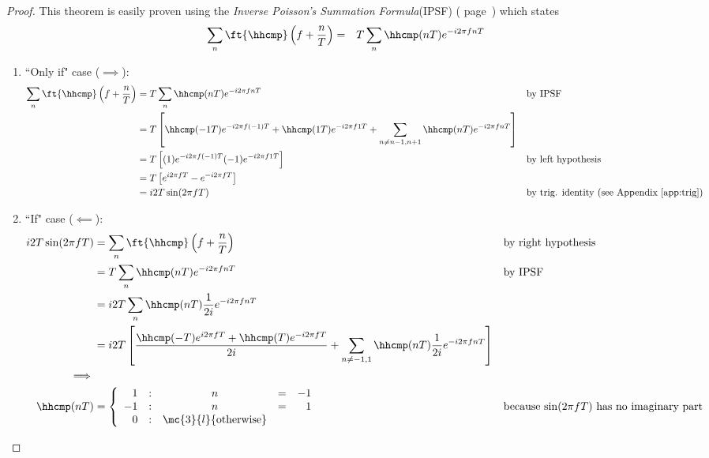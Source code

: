 \begin{proof}
This theorem is easily proven using the
{\em Inverse Poisson's Summation Formula}(IPSF)
( page~\pageref{thm:ipsf})
which states
\begin{eqnarray*}
   \sum_n \ft{\hhcmp}\left( f+ \frac{n}{T} \right)
      &=& T \sum_n \hhcmp(nT) e^{-i2\pi fnT}
\end{eqnarray*}

\begin{enumerate}
  \item ``Only if" case ($\implies$):
\begin{align*}
   \sum_n \ft{\hhcmp}\left( f + \frac{n}{T} \right)
       &= T\sum_n \hhcmp(nT) e^{-i2\pi fnT}
       && \text{by IPSF}
     \\&= T\left[
                  \hhcmp(-1T) e^{-i2\pi f(-1)T} +
                  \hhcmp(1T) e^{-i2\pi f1T} +
                  \sum_{n\ne n-1,n+1} \hhcmp(nT) e^{-i2\pi fnT}
               \right]
     \\&= T\left[
                  (1)  e^{-i2\pi f(-1)T}
                  (-1) e^{-i2\pi f1T}
               \right]
       && \text{by left hypothesis}
     \\&= T\left[e^{i2\pi fT} -e^{-i2\pi fT} \right]
     \\&= i2T \sin( 2\pi fT )
       && \text{by trig. identity (see Appendix \ref{app:trig})}
\end{align*}

\item ``If" case ($\impliedby$):
\begin{align*}
   i2T \sin( 2\pi fT )
       &= \sum_n \ft{\hhcmp}\left( f+\frac{n}{T} \right)
       && \text{by right hypothesis}
     \\&= T \sum_n \hhcmp(nT) e^{-i2\pi fnT}
       && \text{by IPSF}
     \\&= i2T \sum_n \hhcmp(nT) \frac{1}{2i}e^{-i2\pi fnT}
     \\&= i2T \left[
                 \frac{\hhcmp(-T)e^{i2\pi fT} + \hhcmp( T)e^{-i2\pi fT}}
                      {2i}
                 + \sum_{n\ne-1,1} \hhcmp(nT) \frac{1}{2i}e^{-i2\pi fnT}
              \right]
     \\ \implies
\\
   \hhcmp(nT)
   &= \left\{
      \begin{array}{rcccr}
          1 & : & n &=&   -1 \\
         -1 & : & n &=&    1 \\
          0 & : & \mc{3}{l}{\mbox{otherwise}}
      \end{array} \right.
       && \text{because $\sin(2\pi fT)$ has no imaginary part}
\end{align*}
\end{enumerate}
\end{proof}

